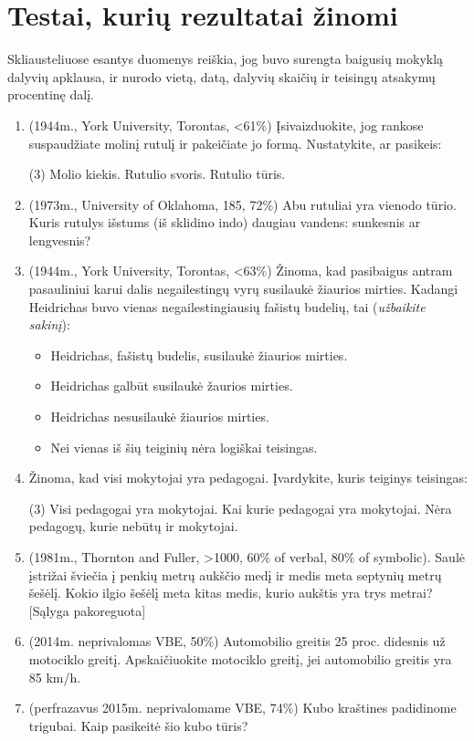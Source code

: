 \documentclass{article}
\begin{document}
\section*{Testai, kurių rezultatai žinomi}
Skliausteliuose esantys duomenys reiškia, jog buvo surengta baigusių mokyklą dalyvių apklausa, ir nurodo vietą, datą, dalyvių skaičių ir teisingų atsakymų procentinę dalį.

\begin{enumerate}
\item (1944m., York University, Torontas, <61\%) Įsivaizduokite, jog rankose suspaudžiate molinį rutulį ir pakeičiate jo formą. Nustatykite, ar pasikeis:
\begin{tasks}(3) 
\task Molio kiekis.
\task Rutulio svoris.
\task Rutulio tūris.
\end{tasks}
\item(1973m., University of Oklahoma, 185, 72\%) Abu rutuliai yra vienodo tūrio. Kuris rutulys išstums (iš sklidino indo) daugiau vandens: sunkesnis ar lengvesnis?
\item (1944m., York University, Torontas, <63\%) Žinoma, kad pasibaigus antram pasauliniui karui dalis negailestingų vyrų susilaukė žiaurios mirties. Kadangi Heidrichas buvo vienas negailestingiausių fašistų budelių, tai (\textit{užbaikite sakinį}):
\begin{itemize}
\item Heidrichas, fašistų budelis, susilaukė žiaurios mirties.
\item Heidrichas galbūt susilaukė žaurios mirties.
\item Heidrichas nesusilaukė žiaurios mirties.
\item Nei vienas iš šių teiginių nėra logiškai teisingas.
\end{itemize}
\item Žinoma, kad visi mokytojai yra pedagogai. Įvardykite, kuris teiginys teisingas:
\begin{tasks}(3) 
\task Visi pedagogai yra mokytojai.
\task Kai kurie pedagogai yra mokytojai.
\task Nėra pedagogų, kurie nebūtų ir mokytojai.
\end{tasks}
\item  (1981m., Thornton and Fuller, >1000, 60\% of verbal, 80\% of symbolic). Saulė įstrižai šviečia į penkių metrų aukščio medį ir medis meta septynių metrų šešėlį. Kokio ilgio šešėlį meta kitas medis, kurio aukštis yra trys metrai? [Sąlyga pakoreguota]
\item  (2014m. neprivalomas VBE, 50\%) Automobilio greitis 25 proc. didesnis už motociklo greitį. Apskaičiuokite motociklo greitį, jei automobilio greitis yra 85 km/h.
\item (perfrazavus 2015m. neprivalomame VBE, 74\%) Kubo kraštines padidinome trigubai. Kaip pasikeitė šio kubo tūris?
\setcounter{enumTemp}{\theenumi}
\end{enumerate}
\end{document}
